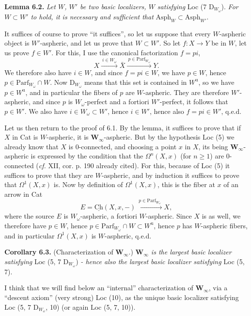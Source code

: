 \textbf{Lemma 6.2.} \textit{Let $W$, $W'$ be two basic localizers, $W$ satisfying} Loc (7 D$_{W_\omega}$). \textit{For $W \subset W'$ to hold, it is necessary and sufficient that} $\mathrm{Asph}_W \subset \mathrm{Asph}_{W'}$.

It suffices of course to prove ``it suffices'', so let us suppose that every $W$-aspheric object is $W'$-aspheric, and let us prove that $W \subset W'$. So let $f : X \longrightarrow Y$ be in $W$, let us prove $f \in W'$. For this, I use the canonical factorization $f = pi$,
\[ X \xrightarrow{\ i \in W_\omega\ } \bar{X} \xrightarrow{\ p \in \mathrm{Parf}_{W_\omega}\ } Y. \]
We therefore also have $i \in W$, and since $f = pi \in W$, we have $p \in W$, hence $p \in \mathrm{Parf}_{W_\omega} \cap W$. Now D$_{W_\omega}$ means that this set is contained in $W^{\mathrm{u}}$, so we have $p \in W^{\mathrm{u}}$, and in particular the fibers of $p$ are $W$-aspheric. They are therefore $W'$-aspheric, and since $p$ is $W_\omega$-perfect and a fortiori $W'$-perfect, it follows that $p \in W'$. We also have $i \in W_\omega \subset W'$, hence $i \in W'$, hence also $f = pi \in W'$, q.e.d.

Let us then return to the proof of 6.1. By the lemma, it suffices to prove that if $X$ in Cat is $W$-aspheric, it is $\mathbf{W}_\infty$-aspheric. But by the hypothesis Loc (5) we already know that $X$ is 0-connected, and choosing a point $x$ in $X$, its being $\mathbf{W}_\infty$-aspheric is expressed by the condition
that the $\Omega^n(X,x)$ (for $n \geq 1$) are 0-connected (\textit{cf.} XII, cor. p. 190 already cited). For this, because of Loc (5) it suffices to prove that they are $W$-aspheric, and by induction it suffices to prove that $\Omega^1(X,x)$ is. Now by definition of $\Omega^1(X,x)$, this is the fiber at $x$ of an arrow in Cat
\[ E = \underline{\mathrm{Ch}}(X,x,-) \xrightarrow{\ p \in \mathrm{Parf}_{W_\omega}\ } X, \]
where the source $E$ is $W_\omega$-aspheric, a fortiori $W$-aspheric. Since $X$ is as well, we therefore have $p \in W$, hence $p \in \mathrm{Parf}_{W_\omega} \cap W \subset W^{\mathrm{u}}$, hence $p$ has $W$-aspheric fibers, and in particular $\Omega^1(X,x)$ is $W$-aspheric, q.e.d.

\textbf{Corollary 6.3.} (Characterization of $\mathbf{W}_\infty$.) \textit{$\mathbf{W}_\infty$ is the largest basic localizer satisfying} Loc (5, 7 D$_{W_\omega}$) \textit{- hence also the largest basic localizer satisfying} Loc (5, 7).

I think that we will find below an ``internal'' characterization of $\mathbf{W}_\infty$, via a ``descent axiom'' (very strong) Loc (10),
as the unique basic localizer satisfying Loc (5, 7 D$_{W_\omega}$, 10) (or again Loc (5, 7, 10)).

